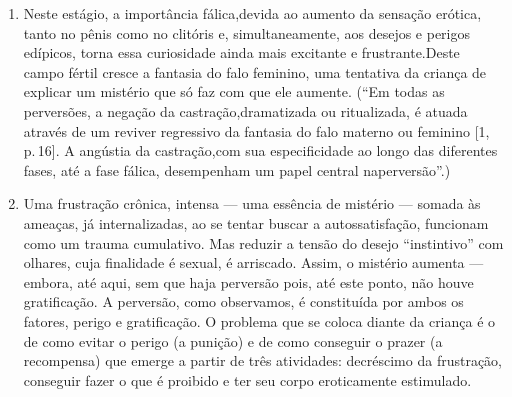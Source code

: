 \begin{enumerate}
\item Neste estágio, a importância fálica,\idxfalo[|(] devida ao aumento da
sensação erótica, tanto no pênis como no clitóris e, simultaneamente,
aos desejos e perigos edípicos, torna essa curiosidade ainda mais
excitante e frustrante.\idxinfanexcit[|)] Deste campo fértil cresce a fantasia do falo
feminino, uma tentativa da criança de explicar um mistério que só faz
com que ele aumente. (``Em todas as perversões, a negação
da castração,\idxcastaconf[|)] dramatizada ou ritualizada, é atuada através de um
reviver regressivo da fantasia do falo materno ou feminino [1, p.\,16]. A angústia da\idxfeticangu{} castração,\idxinfanangu[|)] com sua especificidade ao longo das diferentes fases, até a fase fálica,\idxfasef{} desempenham um papel central na\idxfalo[|)]
perversão''\idxanguinfa[|)] [1, p.\,28].)

\item Uma frustração crônica, intensa --- uma essência de mistério
--- somada às ameaças, já internalizadas, ao se tentar buscar a
autossatisfação, funcionam como um trauma\idxtrauma{} cumulativo. Mas reduzir a
tensão do desejo ``instintivo'' com olhares,
cuja finalidade é sexual, é arriscado. Assim, o mistério aumenta ---
embora, até aqui, sem que haja perversão pois, até este ponto, não
houve gratificação. A perversão, como observamos, é constituída por
ambos os fatores, perigo e gratificação. O problema que se coloca
diante da criança é o de como evitar o perigo (a punição) e de como
conseguir o prazer (a recompensa) que emerge a partir de três
atividades: decréscimo da frustração, conseguir fazer o que é proibido
e ter seu corpo eroticamente estimulado.


\end{enumerate}
